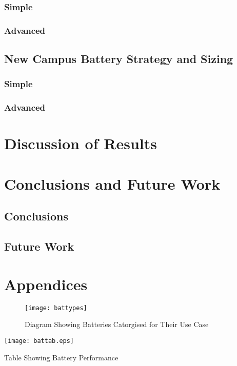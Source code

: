 \subsubsection{Simple}\label{simple}

\subsubsection{Advanced}\label{advanced}

\subsection{New Campus Battery Strategy and
Sizing}\label{new-campus-battery-strategy-and-sizing}

\subsubsection{Simple}\label{simple-1}

\subsubsection{Advanced}\label{advanced-1}

\section{Discussion of Results}\label{discussion-of-results}

\section{Conclusions and Future Work}\label{conclusions-and-future-work}

\subsection{Conclusions}\label{conclusions}

\subsection{Future Work}\label{future-work}

\newpage

\section{Appendices}

\begin{figure}[H]
\centering
\texttt{[image: battypes]}
\caption{Diagram Showing Batteries Catorgised for Their Use Case \cite{Dunn928}}
\label{battypes}
\end{figure}

\begin{landscape}

\begin{table}[H]
\centering
\texttt{[image: battab.eps]}
\caption{Table Showing Battery Performance}
\label{battabs}
\end{table}

\end{landscape}
